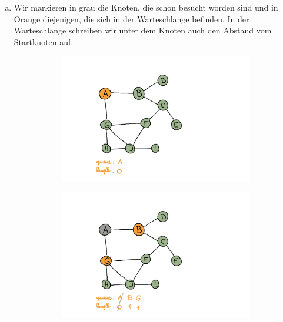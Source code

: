 \begin{enumerate}[(a)]
\item Wir markieren in grau die Knoten, die schon besucht worden sind und in Orange diejenigen, die sich in der Warteschlange befinden. In der Warteschlange schreiben wir unter dem Knoten auch den Abstand vom Startknoten auf.
\begin{figure}[H]
    \centering
    \begin{subfigure}[h]{0.45\textwidth}
    \includegraphics[width=\textwidth]{Pictures/SP/panda_gebissen_0.png}
    \end{subfigure}
    \vspace{5mm}
    \qquad
    \begin{subfigure}[h]{0.45\textwidth}
    \raggedleft
    \includegraphics[width=\textwidth]{Pictures/SP/panda_gebissen_1.png}
    \end{subfigure}
    \vspace{5mm}
    \centering
    \begin{subfigure}[h]{0.45\textwidth}

\end{subfigure}
\end{figure}
\end{enumerate}

